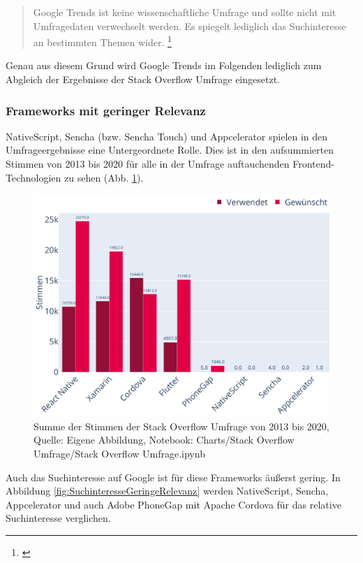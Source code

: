 \begin{quotation}
Google Trends ist keine wissenschaftliche Umfrage und sollte nicht mit Umfragedaten verwechselt werden. Es spiegelt lediglich das Suchinteresse an bestimmten Themen wider. \footnote{\cite{GoogleTrendsHilfe}}
\end{quotation}

Genau aus diesem Grund wird Google Trends im Folgenden lediglich zum Abgleich der Ergebnisse der Stack Overflow Umfrage eingesetzt. 

\subsubsection{Frameworks mit geringer Relevanz}

NativeScript, Sencha (bzw. Sencha Touch) und Appcelerator spielen in den Umfrageergebnisse eine Untergeordnete Rolle. Dies ist in den aufsummierten Stimmen von 2013 bis 2020 für alle in der Umfrage auftauchenden Frontend-Technologien zu sehen (Abb. \ref{fig:SummeDerStimmen}).

\begin{figure}[H]
	\centering
    \includegraphics[width=1.0\textwidth]{Charts/Stack Overflow Umfrage/Summe der Stimmen.pdf}
	\caption[Stimmen der Stack Overflow Umfrage von 2013 bis 2020]{Summe der Stimmen der Stack Overflow Umfrage von 2013 bis 2020, Quelle: Eigene Abbildung, Notebook: Charts/Stack Overflow Umfrage/Stack Overflow Umfrage.ipynb}
	\label{fig:SummeDerStimmen}
\end{figure}

Auch das Suchinteresse auf Google ist für diese Frameworks äußerst gering. In Abbildung \ref{fig:SuchinteresseGeringeRelevanz} werden NativeScript, Sencha, Appcelerator und auch Adobe PhoneGap mit Apache Cordova für das relative Suchinteresse verglichen. 

